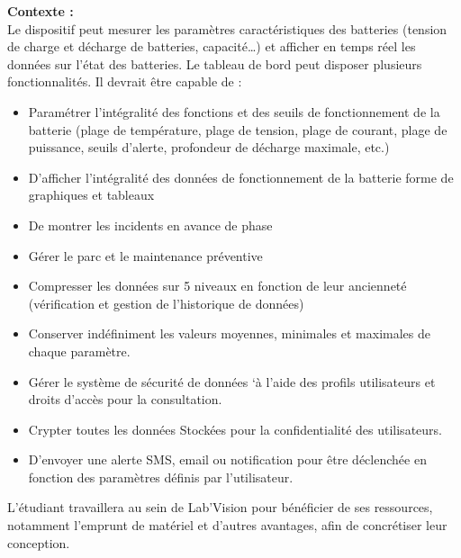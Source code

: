 	\begin{normalsize}
		\noindent\textbf{Contexte :} \\
		
		\indent Le dispositif peut mesurer les paramètres caractéristiques des batteries (tension de charge et décharge de batteries, capacité…) et afficher en temps réel les données sur l’état des batteries.
		Le tableau de bord peut disposer plusieurs fonctionnalités. 
		Il devrait être capable de :
		\begin{itemize}
			\item Paramétrer l’intégralité des fonctions et des seuils de fonctionnement de la batterie (plage de température, plage de tension, plage de courant, plage de puissance, seuils d’alerte, profondeur de décharge maximale, etc.)
			\item	D’afficher l’intégralité des données de fonctionnement de la batterie forme de graphiques et tableaux
		\item	De montrer les incidents en avance de phase
			\item	Gérer le parc et le maintenance préventive
			\item	Compresser les données sur 5 niveaux en fonction de leur ancienneté (vérification et gestion de l’historique de données)
			\item	Conserver indéfiniment les valeurs moyennes, minimales et maximales de chaque paramètre. 
			\item	Gérer le système de sécurité de données `à l’aide des profils utilisateurs et droits d’accès pour la consultation.
			\item	Crypter toutes les données Stockées pour la confidentialité des utilisateurs.
			\item	D’envoyer une alerte SMS, email ou notification pour être déclenchée en fonction des paramètres définis par l’utilisateur.
\\
		\end{itemize}
		
		\noindent L’étudiant travaillera au sein de Lab’Vision pour bénéficier de ses ressources, notamment l’emprunt de matériel et d’autres avantages, afin de concrétiser leur conception.
\\
		
	\end{normalsize}

